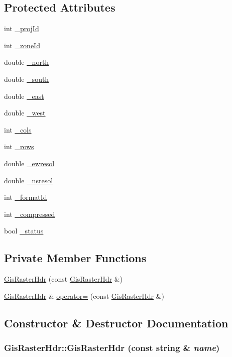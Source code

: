 \subsection*{Protected Attributes}
\begin{CompactItemize}
\item 
int \hyperlink{classGisRasterHdr_p0}{\_\-proj\-Id}
\item 
int \hyperlink{classGisRasterHdr_p1}{\_\-zone\-Id}
\item 
double \hyperlink{classGisRasterHdr_p2}{\_\-north}
\item 
double \hyperlink{classGisRasterHdr_p3}{\_\-south}
\item 
double \hyperlink{classGisRasterHdr_p4}{\_\-east}
\item 
double \hyperlink{classGisRasterHdr_p5}{\_\-west}
\item 
int \hyperlink{classGisRasterHdr_p6}{\_\-cols}
\item 
int \hyperlink{classGisRasterHdr_p7}{\_\-rows}
\item 
double \hyperlink{classGisRasterHdr_p8}{\_\-ewresol}
\item 
double \hyperlink{classGisRasterHdr_p9}{\_\-nsresol}
\item 
int \hyperlink{classGisRasterHdr_p10}{\_\-format\-Id}
\item 
int \hyperlink{classGisRasterHdr_p11}{\_\-compressed}
\item 
bool \hyperlink{classGisRasterHdr_p12}{\_\-status}
\end{CompactItemize}
\subsection*{Private Member Functions}
\begin{CompactItemize}
\item 
\hyperlink{classGisRasterHdr_d0}{Gis\-Raster\-Hdr} (const \hyperlink{classGisRasterHdr}{Gis\-Raster\-Hdr} \&)
\item 
\hyperlink{classGisRasterHdr}{Gis\-Raster\-Hdr} \& \hyperlink{classGisRasterHdr_d1}{operator=} (const \hyperlink{classGisRasterHdr}{Gis\-Raster\-Hdr} \&)
\end{CompactItemize}


\subsection{Constructor \& Destructor Documentation}
\hypertarget{classGisRasterHdr_a0}{
\subsubsection[GisRasterHdr]{\setlength{\rightskip}{0pt plus 5cm}Gis\-Raster\-Hdr::Gis\-Raster\-Hdr (const string \& {\em name})}}
\label{classGisRasterHdr_a0}


